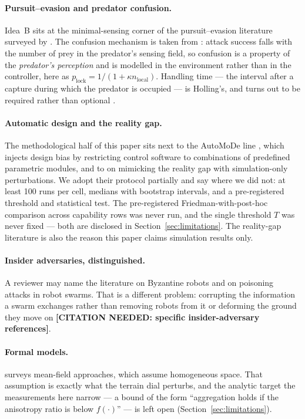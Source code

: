 \documentclass[11pt,a4paper]{article}
\newcommand{\citeneed}[1]{\textbf{[CITATION NEEDED: #1]}}
\begin{document}
\paragraph{Pursuit--evasion and predator confusion.} Idea~B sits at the
minimal-sensing corner of the pursuit--evasion literature surveyed by
\citet{chung2011}. The confusion mechanism is taken from \citet{olson2013}:
attack success falls with the number of prey in the predator's sensing field, so
confusion is a property of the \emph{predator's perception} and is modelled in
the environment rather than in the controller, here as
$p_{\mathrm{lock}} = 1/(1 + \kappa n_{\mathrm{local}})$. Handling time --- the
interval after a capture during which the predator is occupied --- is Holling's,
and turns out to be required rather than optional
\citep{holling1959}.

\paragraph{Automatic design and the reality gap.} The methodological half of
this paper sits next to the AutoMoDe line \citep{francesca2014, birattari2019},
which injects design bias by restricting control software to combinations of
predefined parametric modules, and to \citet{ligot2018} on mimicking the reality
gap with simulation-only perturbations. We adopt their protocol partially and
say where we did not: at least 100 runs per cell, medians with bootstrap
intervals, and a pre-registered threshold and statistical test. The pre-registered
Friedman-with-post-hoc comparison across capability rows was never run, and the
single threshold $T$ was never fixed --- both are disclosed in
Section~\ref{sec:limitations}. The reality-gap literature
\citep{jakobi1995,ligot2018} is also the reason this paper claims simulation
results only.

\paragraph{Insider adversaries, distinguished.} A reviewer may name the
literature on Byzantine robots and on poisoning attacks in robot swarms. That is a
different problem: corrupting the information a swarm exchanges rather than
removing robots from it or deforming the ground they move on \citeneed{specific insider-adversary references}.

\paragraph{Formal models.} \citet{hamann2018} surveys mean-field approaches,
which assume homogeneous space. That assumption is exactly what the terrain dial
perturbs, and the analytic target the measurements here narrow --- a bound of
the form ``aggregation holds if the anisotropy ratio is below $f(\cdot)$'' --- is
left open (Section~\ref{sec:limitations}).
\end{document}
